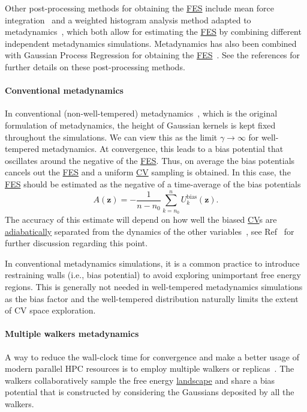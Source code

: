 \documentclass[9pt,review]{livecoms}
\newcommand{\vz}{\mathbf{z}}
\begin{document}
Other post-processing methods for obtaining the \hyperlink{ref:FES} {FES} include mean force integration~\cite{10.1063/1.5123498} and a weighted histogram analysis method adapted to metadynamics~\cite{10.1016/j.cplett.2020.137384}, which both allow for estimating the \hyperlink{ref:FES} {FES} by combining different independent metadynamics simulations.  Metadynamics has also been combined with Gaussian Process Regression for obtaining the \hyperlink{ref:FES} {FES}~\cite{Mones2016}. See the references for further details on these post-processing methods. 


\paragraph{Conventional metadynamics}
\label{sec:meta-classic}
In conventional (non-well-tempered) metadynamics~\cite{Laio-PNAS-2002}, which is the original formulation of metadynamics, the height of Gaussian kernels is kept fixed throughout the simulations. We can view this as the limit $
\gamma \to \infty$ for well-tempered metadynamics. At convergence, this leads to a bias potential that oscillates around the negative of the \hyperlink{ref:FES} {FES}. Thus, on average the bias potentials cancels out the \hyperlink{ref:FES} {FES} and a uniform \hyperlink{ref:CV} {CV} sampling is obtained. In this case, the \hyperlink{ref:FES} {FES} should be estimated as the negative of a time-average of the bias potentials~\cite{BussiLaio_ReviewMetaD_2020}
\begin{equation}
A(\vz) = - \frac{1}{n-n_0} \sum^{n}_{k=n_0} U^{\mathrm{bias}}_k(\vz).
\end{equation}
The accuracy of this estimate will depend on how well the biased \hyperlink{ref:CV} {CV}s are \hyperlink{ref:AdiabaticDyn} {adiabatically} separated from the dynamics of the other variables~\cite{laio-gervasio-08,jourdain-lelievre-zitt-21}, see Ref~\cite{BussiLaio_ReviewMetaD_2020} for further discussion regarding this point.

In conventional metadynamics simulations, it is a common practice to introduce restraining walls (i.e., bias potential) to avoid exploring unimportant free energy regions. This is generally not needed in well-tempered metadynamics simulations as the bias factor and the well-tempered distribution naturally limits the extent of CV space exploration.

\paragraph{Multiple walkers metadynamics}
\label{sec:mwmeta}
A way to reduce the wall-clock time for convergence and make a better usage of modern parallel HPC resources is to employ multiple walkers or replicas~\cite{Raiteri-JPCB-2006}. The walkers collaboratively sample the free energy \hyperlink{ref:FES} {landscape} and share a bias potential that is constructed by considering the Gaussians deposited by all the walkers.
\end{document}
